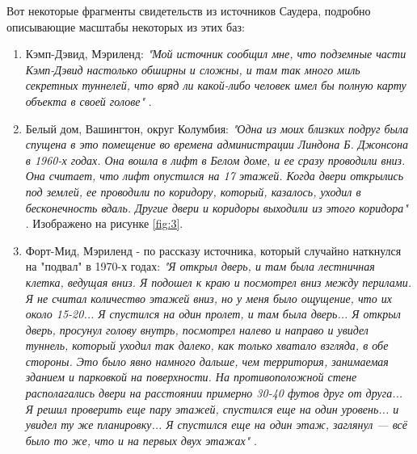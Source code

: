 \documentclass[10pt,twocolumn,letterpaper]{article}
\begin{document}
Вот некоторые фрагменты свидетельств из источников Саудера, подробно описывающие масштабы некоторых из этих баз:
\begin{flushleft}
\begin{enumerate}
    \item Кэмп-Дэвид, Мэриленд: \textit{"Мой источник сообщил мне, что подземные части Кэмп-Дэвид настолько обширны и сложны, и там так много миль секретных туннелей, что вряд ли какой-либо человек имел бы полную карту объекта в своей голове"} \cite{22}.
    \item Белый дом, Вашингтон, округ Колумбия: \textit{"Одна из моих близких подруг была спущена в это помещение во времена администрации Линдона Б. Джонсона в 1960-х годах. Она вошла в лифт в Белом доме, и ее сразу проводили вниз. Она считает, что лифт опустился на 17 этажей. Когда двери открылись под землей, ее проводили по коридору, который, казалось, уходил в бесконечность вдаль. Другие двери и коридоры выходили из этого коридора"} \cite{22}. Изображено на рисунке \ref{fig:3}.
    \item Форт-Мид, Мэриленд - по рассказу источника, который случайно наткнулся на "подвал" в 1970-х годах: \textit{"Я открыл дверь, и там была лестничная клетка, ведущая вниз. Я подошел к краю и посмотрел вниз между перилами. Я не считал количество этажей вниз, но у меня было ощущение, что их около 15-20... Я спустился на один пролет, и там была дверь... Я открыл дверь, просунул голову внутрь, посмотрел налево и направо и увидел туннель, который уходил так далеко, как только хватало взгляда, в обе стороны. Это было явно намного дальше, чем территория, занимаемая зданием и парковкой на поверхности. На противоположной стене располагались двери на расстоянии примерно 30-40 футов друг от друга... Я решил проверить еще пару этажей, спустился еще на один уровень... и увидел ту же планировку... Я спустился еще на один этаж, заглянул — всё было то же, что и на первых двух этажах"} \cite{22}.
\end{enumerate}
\end{flushleft}
\end{document}

